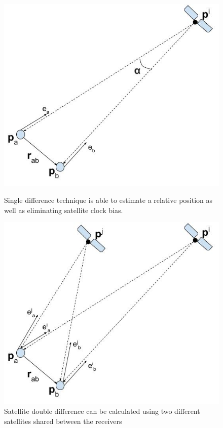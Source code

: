 \begin{figure}
\begin{minipage}[t]{0.48\textwidth}
\includegraphics[width=\textwidth]{Background/relativePos}
\caption{\label{fig:relPos}Single difference technique is able to estimate a relative position as well as eliminating satellite clock bias.}
\end{minipage}
\hspace{1mm}
\begin{minipage}[t]{0.48\textwidth}
\includegraphics[width=\textwidth]{Background/relativePosDoubleDiff}
\caption{\label{fig:relPosDD}Satellite double difference can be calculated using two different satellites shared between the receivers}
\end{minipage}
\end{figure}

